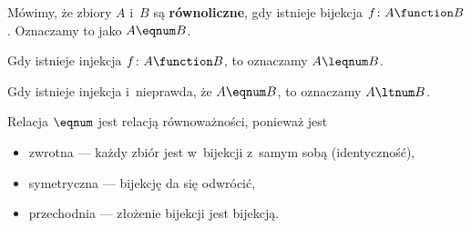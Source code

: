 \begin{definition}
Mówimy, że zbiory \(A\) i~\(B\) są \textbf{równoliczne}, gdy istnieje bijekcja \(f\colon A \function B\). Oznaczamy to jako \(A \eqnum B\).

Gdy istnieje injekcja \(f\colon A \function B\), to oznaczamy \(A \leqnum B\).

Gdy istnieje injekcja i~nieprawda, że \(A \eqnum B\), to oznaczamy \(A \ltnum B\).
\end{definition}
Relacja \({\eqnum}\) jest relacją równoważności, ponieważ jest
\begin{itemize}
    \item zwrotna --- każdy zbiór jest w~bijekcji z~samym sobą (identyczność),
    \item symetryczna --- bijekcję da się odwrócić,
    \item przechodnia --- złożenie bijekcji jest bijekcją.
\end{itemize}
